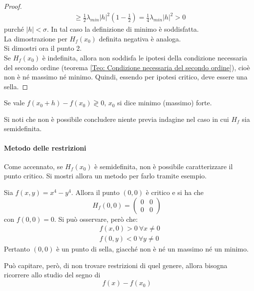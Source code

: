 \begin{proof}
\begin{equation}
\begin{aligned}
            &\geq \frac{1}{2}\lambda_{min}|h|^2(1-\frac{1}{2})=\frac{1}{4}\lambda_{min}|h|^2 >0
            \end{aligned}
        \end{equation}
        purché $|h|< \sigma$. In tal caso la definizione di minimo è soddisfatta.\\
        La dimostrazione per $H_f(x_0)$ definita negativa è analoga.\\
    Si dimostri ora il punto 2.\\
    Se $H_f(x_0)$ è indefinita, allora non soddisfa le ipotesi della condizione necessaria del secondo ordine (teorema \ref{Teo: Condizione necessaria del secondo ordine}), cioè non è né massimo né minimo. Quindi, essendo per ipotesi critico, deve essere una sella.
    \end{proof}
    \begin{oss}
        Se vale $f(x_0+h)-f(x_0) \gtrless 0$, $x_0$ si dice minimo (massimo) forte.
    \end{oss}
    \begin{oss}
        Si noti che non è possibile concludere niente previa indagine nel caso in cui $H_f$ sia semidefinita.
    \end{oss}
    \paragraph{Metodo delle restrizioni} Come accennato, se $H_f(x_0)$ è semidefinita, non è possibile caratterizzare il punto critico. Si mostri allora un metodo per farlo tramite esempio.
    \begin{example}
        Sia $f(x,y)=x^4-y^4$. Allora il punto $(0,0)$ è critico e si ha che
        \begin{equation*}
            H_f(0,0)=\begin{pmatrix}
                0 & 0\\
                0 & 0
            \end{pmatrix}
        \end{equation*}
        con $f(0,0)=0$. Si può osservare, però che:
        \begin{equation*}
            \begin{aligned}
                &f(x, 0) > 0\ \forall x \neq 0\\
                &f(0,y) < 0 \ \forall y \neq 0
            \end{aligned}
        \end{equation*}
        Pertanto $(0,0)$ è un punto di sella, giacché non è né un massimo né un minimo.
    \end{example}
    Può capitare, però, di non trovare restrizioni di quel genere, allora bisogna ricorrere allo studio del segno di
    \begin{equation*}
        f(x)-f(x_0)
    \end{equation*}
